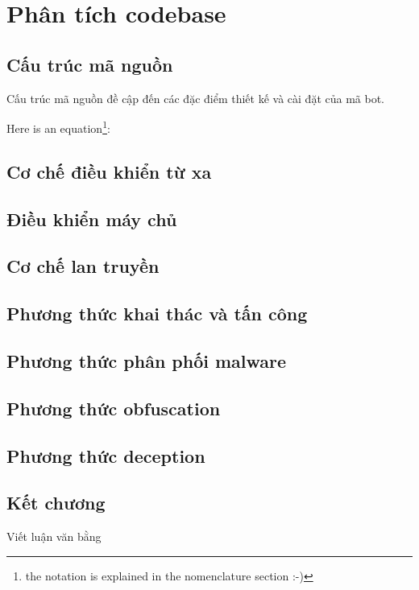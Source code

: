 
\chapter{Phân tích codebase}


\section{Cấu trúc mã nguồn}

Cấu trúc mã nguồn đề cập đến các đặc điểm thiết kế và cài đặt của mã bot.


Here is an equation\footnote{the notation is explained in the nomenclature section :-)}:

\section{Cơ chế điều khiển từ xa}
\section{Điều khiển máy chủ}
\section{Cơ chế lan truyền}
\section{Phương thức khai thác và tấn công}
\section{Phương thức phân phối malware}
\section{Phương thức obfuscation}
\section{Phương thức deception}

\section{Kết chương}
Viết luận văn bằng